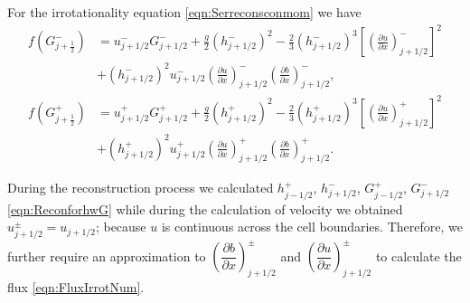 For the irrotationality equation \eqref{eqn:Serreconsconmom} we have 
\begin{subequations}
\begin{align}
f\left(G^-_{j+\frac{1}{2}}\right) &=  u^-_{j + 1/2} G^-_{j + 1/2}  + \frac{g}{2}\left(h^-_{j + 1/2} \right)^2 - \frac{2}{3}\left(h^-_{j + 1/2}\right)^3 \left[\left(\frac{\partial {u}}{\partial x} \right)^-_{j + 1/2} \right]^2 \\ &+ \left(h^-_{j + 1/2}\right)^2 u^-_{j + 1/2} \left(\frac{\partial {u}}{\partial x} \right)^-_{j + 1/2} \left(\frac{\partial b}{\partial x} \right)^-_{j + 1/2}  ,\\
f\left(G^+_{j+\frac{1}{2}}\right) &= u^+_{j + 1/2} G^+_{j + 1/2}  + \frac{g}{2}\left(h^+_{j + 1/2} \right)^2 - \frac{2}{3}\left(h^+_{j + 1/2}\right)^3 \left[\left(\frac{\partial {u}}{\partial x} \right)^+_{j + 1/2} \right]^2 \\ &+ \left(h^+_{j + 1/2}\right)^2 u^+_{j + 1/2} \left(\frac{\partial {u}}{\partial x} \right)^+_{j + 1/2} \left(\frac{\partial b}{\partial x} \right)^+_{j + 1/2}.
\end{align}
\label{eqn:FluxIrrotNum}
\end{subequations}

During the reconstruction process we calculated $h^+_{j - 1/2}$, $h^-_{j + 1/2}$, $G^+_{j - 1/2}$, $G^-_{j + 1/2}$ \eqref{eqn:ReconforhwG} while during the calculation of velocity we obtained $u^\pm_{j+1/2} = u_{j+1/2}$; because $u$ is continuous across the cell boundaries. Therefore, we further require an approximation to $\left(\dfrac{\partial {b}}{\partial x} \right)^\pm_{j + 1/2}$ and $\left(\dfrac{\partial {u}}{\partial x} \right)^\pm_{j + 1/2}$ to calculate the flux \eqref{eqn:FluxIrrotNum}. 

